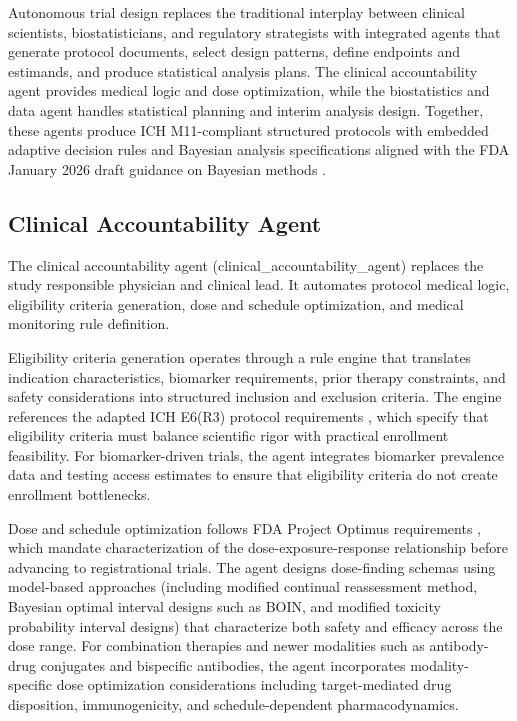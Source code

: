
Autonomous trial design replaces the traditional interplay between clinical scientists,
biostatisticians, and regulatory strategists with integrated agents that generate protocol
documents, select design patterns, define endpoints and estimands, and produce statistical
analysis plans. The clinical accountability agent provides medical logic and dose optimization,
while the biostatistics and data agent handles statistical planning and interim analysis
design. Together, these agents produce ICH M11-compliant structured protocols \cite{ich-m11}
with embedded adaptive decision rules and Bayesian analysis specifications aligned with the
FDA January 2026 draft guidance on Bayesian methods \cite{fda-bayesian-guidance}.

\subsection{Clinical Accountability Agent}

The clinical accountability agent (clinical\_accountability\_agent) replaces the study
responsible physician and clinical lead. It automates protocol medical logic, eligibility
criteria generation, dose and schedule optimization, and medical monitoring rule definition.

Eligibility criteria generation operates through a rule engine that translates indication
characteristics, biomarker requirements, prior therapy constraints, and safety
considerations into structured inclusion and exclusion criteria. The engine references the
adapted ICH E6(R3) protocol requirements \cite{ich-adapt}, which specify that eligibility
criteria must balance scientific rigor with practical enrollment feasibility. For
biomarker-driven trials, the agent integrates biomarker prevalence data and testing
access estimates to ensure that eligibility criteria do not create enrollment bottlenecks.

Dose and schedule optimization follows FDA Project Optimus requirements
\cite{fda-project-optimus}, which mandate characterization of the dose-exposure-response
relationship before advancing to registrational trials. The agent designs dose-finding
schemas using model-based approaches (including modified continual reassessment method,
Bayesian optimal interval designs such as BOIN, and modified toxicity probability
interval designs) that characterize both safety and efficacy across the dose range. For
combination therapies and newer modalities such as antibody-drug conjugates and bispecific
antibodies, the agent incorporates modality-specific dose optimization considerations
including target-mediated drug disposition, immunogenicity, and schedule-dependent
pharmacodynamics.

